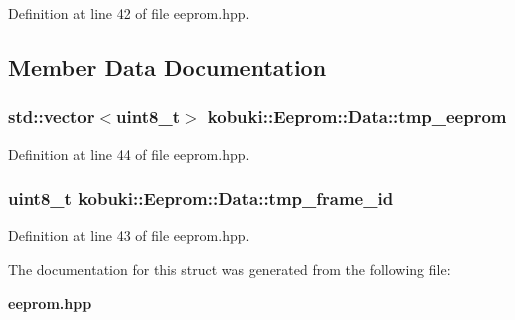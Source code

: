 \-Definition at line 42 of file eeprom.\-hpp.



\subsection{\-Member \-Data \-Documentation}
\subsubsection[{tmp\-\_\-eeprom}]{\setlength{\rightskip}{0pt plus 5cm}std\-::vector$<$uint8\-\_\-t$>$ {\bf kobuki\-::\-Eeprom\-::\-Data\-::tmp\-\_\-eeprom}}\label{structkobuki_1_1Eeprom_1_1Data_a40259e53d69c4e01c95fbefceb66a371}


\-Definition at line 44 of file eeprom.\-hpp.

\subsubsection[{tmp\-\_\-frame\-\_\-id}]{\setlength{\rightskip}{0pt plus 5cm}uint8\-\_\-t {\bf kobuki\-::\-Eeprom\-::\-Data\-::tmp\-\_\-frame\-\_\-id}}\label{structkobuki_1_1Eeprom_1_1Data_a49fd4240664c5ece3ce78c38144c6e2c}


\-Definition at line 43 of file eeprom.\-hpp.



\-The documentation for this struct was generated from the following file\-:\begin{DoxyCompactItemize}
\item 
{\bf eeprom.\-hpp}\end{DoxyCompactItemize}
